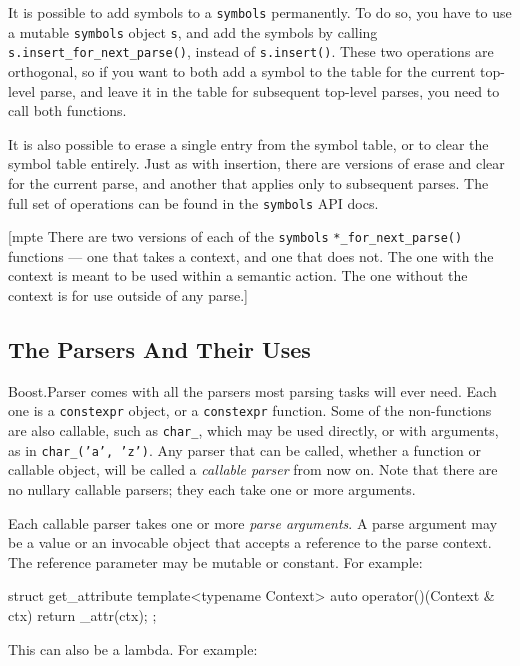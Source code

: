 It is possible to add symbols to a \texttt{symbols} permanently. To do so, you have to use a mutable \texttt{symbols} object \texttt{s}, and add the symbols by calling \texttt{s.insert\_for\_next\_parse()}, instead of \texttt{s.insert()}. These two operations are orthogonal, so if you want to both add a symbol to the table for the current top-level parse, and leave it in the table for subsequent top-level parses, you need to call both functions.

It is also possible to erase a single entry from the symbol table, or to clear the symbol table entirely. Just as with insertion, there are versions of erase and clear for the current parse, and another that applies only to subsequent parses. The full set of operations can be found in the \texttt{symbols} API docs.

{[}mpte There are two versions of each of the \texttt{symbols} \texttt{*\_for\_next\_parse()} functions --- one that takes a context, and one that does not. The one with the context is meant to be used within a semantic action. The one without the context is for use outside of any parse.{]}

\subsection{The Parsers And Their Uses}

Boost.Parser comes with all the parsers most parsing tasks will ever need. Each one is a \texttt{constexpr} object, or a \texttt{constexpr} function. Some of the non-functions are also callable, such as \texttt{char\_}, which may be used directly, or with arguments, as in \texttt{char\_}\texttt{('a', 'z')}. Any parser that can be called, whether a function or callable object, will be called a \emph{callable parser} from now on. Note that there are no nullary callable parsers; they each take one or more arguments.

Each callable parser takes one or more \emph{parse arguments}. A parse argument may be a value or an invocable object that accepts a reference to the parse context. The reference parameter may be mutable or constant. For example:

\begin{code}
struct get_attribute
{
    template<typename Context>
    auto operator()(Context & ctx)
    {
        return _attr(ctx);
    }
};
\end{code}

This can also be a lambda. For example:

